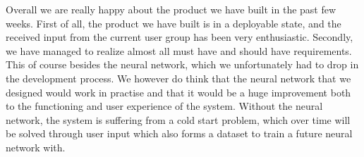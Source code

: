 Overall we are really happy about the product we have built in the past few weeks.
First of all, the product we have built is in a deployable state, and the received input from the current user group has been very enthusiastic.
Secondly, we have managed to realize almost all must have and should have requirements. This of course besides the neural network, which we unfortunately had to drop in the development process.
We however do think that the neural network that we designed would work in practise and that it would be a huge improvement both to the functioning and user experience of the system.%
Without the neural network, the system is suffering from a cold start problem, which over time will be solved through user input which also forms a dataset to train a future neural network with.
